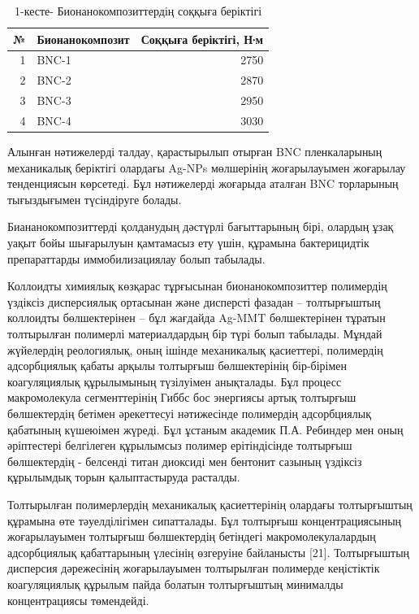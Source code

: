 \begin{table}[H]
\caption*{1-кесте- Бионанокомпозиттердің соққыға беріктігі}
\centering
\begin{tabular}{|r|l|r|}
\hline
\multicolumn{1}{|l|}{№} & Бионанокомпозит & \multicolumn{1}{l|}{Соққыға беріктігі, Н∙м} \\ \hline
1 & BNC-1 & 2750 \\ \hline
2 & BNC-2 & 2870 \\ \hline
3 & BNC-3 & 2950 \\ \hline
4 & BNC-4 & 3030 \\ \hline
\end{tabular}
\end{table}

\begin{multicols}{2}
Алынған нәтижелерді талдау, қарастырылып отырған BNC пленкаларының
механикалық беріктігі олардағы Ag-NPs мөлшерінің жоғарылауымен жоғарылау
тенденциясын көрсетеді. Бұл нәтижелерді жоғарыда аталған BNC торларының
тығыздығымен түсіндіруге болады.

Биананокомпозиттерді қолданудың дәстүрлі бағыттарының бірі, олардың ұзақ
уақыт бойы шығарылуын қамтамасыз ету үшін, құрамына бактерицидтік
препараттарды иммобилизациялау болып табылады.

Коллоидты химиялық көзқарас тұрғысынан бионанокомпозиттер полимердің
үздіксіз дисперсиялық ортасынан және дисперсті фазадан -- толтырғыштың
коллоидты бөлшектерінен -- бұл жағдайда Ag-MMT бөлшектерінен тұратын
толтырылған полимерлі материалдардың бір түрі болып табылады. Мұндай
жүйелердің реологиялық, оның ішінде механикалық қасиеттері, полимердің
адсорбциялық қабаты арқылы толтырғыш бөлшектерінің бір-бірімен
коагуляциялық құрылымының түзілуімен анықталады. Бұл процесс
макромолекула сегменттерінің Гиббс бос энергиясы артық толтырғыш
бөлшектердің бетімен әрекеттесуі нәтижесінде полимердің адсорбциялық
қабатының күшеюімен жүреді. Бұл ұстаным академик П.А. Ребиндер мен оның
әріптестері белгілеген құрылымсыз полимер ерітіндісінде толтырғыш
бөлшектердің - белсенді титан диоксиді мен бентонит сазының үздіксіз
құрылымдық торын қалыптастыруда расталды.

Толтырылған полимерлердің механикалық қасиеттерінің олардағы
толтырғыштың құрамына өте тәуелділігімен сипатталады. Бұл толтырғыш
концентрациясының жоғарылауымен толтырғыш бөлшектердің бетіндегі
макромолекулалардың адсорбциялық қабаттарының үлесінің өзгеруіне
байланысты {[}21{]}. Толтырғыштың дисперсия дәрежесінің жоғарылауымен
толтырылған полимерде кеңістіктік коагуляциялық құрылым пайда болатын
толтырғыштың минималды концентрациясы төмендейді.


\end{multicols}
